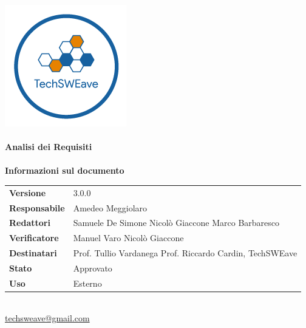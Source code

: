 \documentclass[a4paper]{article}
\begin{document}
\begin{titlepage}
    \begin{center}
        \includegraphics{../../../Images/logo.png}\\
        \vspace{20px}
        \textcolor{logo}{\hrulefill}\\
        \vspace{20px}
        \textbf{\huge\textcolor{logo}{Analisi dei Requisiti}}\\
        \vspace{10px}
        \textcolor{logo}{\hrulefill}\\
        \vspace{40px}
        \textbf{\Large Informazioni sul documento}\\
        \vspace{20px}
        \begin{tabular}{p{100px} | p{100px}}
            \textbf{Versione}     & 3.0.0                                                                      \\
            \textbf{Responsabile} & Amedeo Meggiolaro                                                          \\
            \textbf{Redattori}    & Samuele De Simone \newline Nicolò Giaccone \newline Marco Barbaresco       \\
            \textbf{Verificatore} & Manuel Varo \newline Nicolò Giaccone                                       \\
            \textbf{Destinatari}  & Prof. Tullio Vardanega \newline Prof. Riccardo Cardin, \newline TechSWEave \\
            \textbf{Stato}        & Approvato                                                                  \\
            \textbf{Uso}          & Esterno                                                                    \\
        \end{tabular}\\
        \vspace{60px}
        \href{mailto:techsweave@gmail.com}{techsweave@gmail.com}\\

    \end{center}
\end{titlepage}
\end{document}
